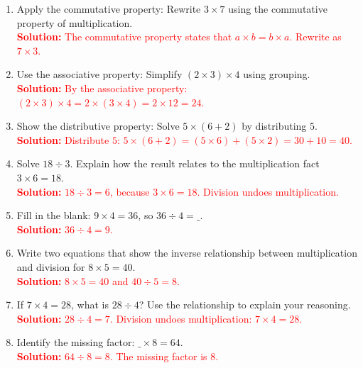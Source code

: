 \documentclass[12pt]{article}
\begin{document}
\begin{tcolorbox}[colframe=black!60, colback=white, 
coltitle=black, colbacktitle=black!15, fonttitle=\bfseries\Large, 
title=Exercises, halign title=center, left=10pt, right=10pt, top=10pt, bottom=60pt]
\begin{enumerate}[itemsep=3em]
    \item Apply the commutative property: Rewrite \(3 \times 7\) using the commutative property of multiplication.\\
    \textcolor{red}{\textbf{Solution:} The commutative property states that \(a \times b = b \times a\). Rewrite as \(7 \times 3\).}

    \item Use the associative property: Simplify \( (2 \times 3) \times 4 \) using grouping.\\
    \textcolor{red}{\textbf{Solution:} By the associative property: \((2 \times 3) \times 4 = 2 \times (3 \times 4) = 2 \times 12 = 24\).}

    \item Show the distributive property: Solve \(5 \times (6 + 2)\) by distributing \(5\).\\
    \textcolor{red}{\textbf{Solution:} Distribute \(5\): \(5 \times (6 + 2) = (5 \times 6) + (5 \times 2) = 30 + 10 = 40\).}

    \item Solve \(18 \div 3\). Explain how the result relates to the multiplication fact \(3 \times 6 = 18\).\\
    \textcolor{red}{\textbf{Solution:} \(18 \div 3 = 6\), because \(3 \times 6 = 18\). Division undoes multiplication.}

    \item Fill in the blank: \(9 \times 4 = 36\), so \(36 \div 4 = \_ \).\\
    \textcolor{red}{\textbf{Solution:} \(36 \div 4 = 9\).}

    \item Write two equations that show the inverse relationship between multiplication and division for \(8 \times 5 = 40\).\\
    \textcolor{red}{\textbf{Solution:} \(8 \times 5 = 40\) and \(40 \div 5 = 8\).}

    \item If \(7 \times 4 = 28\), what is \(28 \div 4\)? Use the relationship to explain your reasoning.\\
    \textcolor{red}{\textbf{Solution:} \(28 \div 4 = 7\). Division undoes multiplication: \(7 \times 4 = 28\).}

    \item Identify the missing factor: \(\_ \times 8 = 64\).\\
    \textcolor{red}{\textbf{Solution:} \(64 \div 8 = 8\). The missing factor is \(8\).}
\end{enumerate}
\end{tcolorbox}
\end{document}
